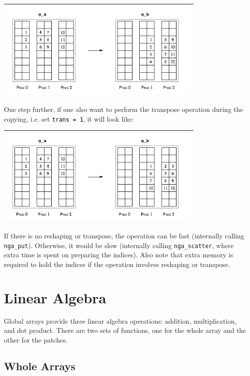 \begin{tabular}{|c|}
\hline 
\includegraphics[width=10cm]{copy1}\tabularnewline
\hline
\end{tabular}

One step further, if one also want to perform the transpose operation
during the copying, i.e. set \texttt{\textcolor{black}{trans = 1}},
it will look like: 

\begin{tabular}{|c|}
\hline 
\includegraphics[width=10cm]{copy2}\tabularnewline
\hline
\end{tabular}

If there is no reshaping or transpose, the operation can be fast (internally
calling \texttt{nga\_put}). Otherwise, it would be slow (internally
calling \texttt{nga\_scatter}, where extra time is spent on preparing
the indices). Also note that extra memory is required to hold the
indices if the operation involves reshaping or transpose. 


\section{Linear Algebra }

Global arrays provide three linear algebra operations: addition, multiplication,
and dot product. There are two sets of functions, one for the whole
array and the other for the patches. 


\subsection{Whole Arrays }

